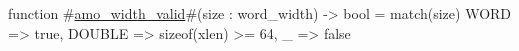 function #\hyperref[sailRISCVzamozywidthzyvalid]{amo\_width\_valid}#(size : word_width) -> bool = {
  match(size) {
    WORD   => true,
    DOUBLE => sizeof(xlen) >= 64,
    _      => false
  }
}
